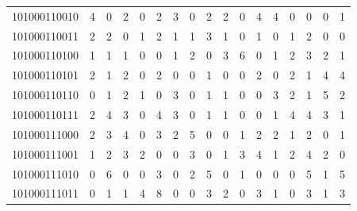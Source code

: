 \documentclass[10pt,a4paper]{article}
\begin{document}
\begin{longtable}{ |c|c|c|c|c|c|c|c|c|c|c|c|c|c|c|c|c| }
    101000110010              & 4                            & 0                                & 2                            & 0                              & 2   & 3   & 0   & 2   & 2   & 0   & 4   & 4   & 0   & 0   & 0   & 1   \\
    101000110011              & 2                            & 2                                & 0                            & 1                              & 2   & 1   & 1   & 3   & 1   & 0   & 1   & 0   & 1   & 2   & 0   & 0   \\
    101000110100              & 1                            & 1                                & 1                            & 0                              & 0   & 1   & 2   & 0   & 3   & 6   & 0   & 1   & 2   & 3   & 2   & 1   \\
    101000110101              & 2                            & 1                                & 2                            & 0                              & 2   & 0   & 0   & 1   & 0   & 0   & 2   & 0   & 2   & 1   & 4   & 4   \\
    101000110110              & 0                            & 1                                & 2                            & 1                              & 0   & 3   & 0   & 1   & 1   & 0   & 0   & 3   & 2   & 1   & 5   & 2   \\
    101000110111              & 2                            & 4                                & 3                            & 0                              & 4   & 3   & 0   & 1   & 1   & 0   & 0   & 1   & 4   & 4   & 3   & 1   \\
    101000111000              & 2                            & 3                                & 4                            & 0                              & 3   & 2   & 5   & 0   & 0   & 1   & 2   & 2   & 1   & 2   & 0   & 1   \\
    101000111001              & 1                            & 2                                & 3                            & 2                              & 0   & 0   & 3   & 0   & 1   & 3   & 4   & 1   & 2   & 4   & 2   & 0   \\
    101000111010              & 0                            & 6                                & 0                            & 0                              & 3   & 0   & 2   & 5   & 0   & 1   & 0   & 0   & 0   & 5   & 1   & 5   \\
    101000111011              & 0                            & 1                                & 1                            & 4                              & 8   & 0   & 0   & 3   & 2   & 0   & 3   & 1   & 0   & 3   & 1   & 3   \\

\end{longtable}
\end{document}
